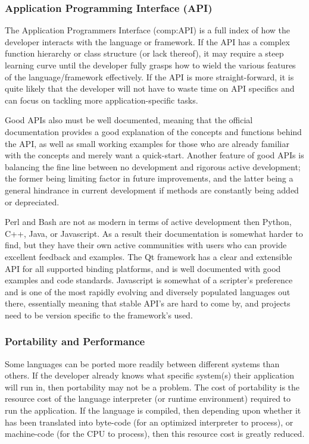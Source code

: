 \subsubsection{Application Programming Interface (API)}

The Application Programmers Interface (\gls{comp:API}) is a full index of how the developer interacts with the language or framework. If the API has a complex function hierarchy or class structure (or lack thereof), it may require a steep learning curve until the developer fully grasps how to wield the various features of the language/framework effectively. If the API is more straight-forward, it is quite likely that the developer will not have to waste time on API specifics and can focus on tackling more application-specific tasks. 

Good APIs also must be well documented, meaning that the official documentation provides a good explanation of the concepts and functions behind the API, as well as small working examples for those who are already familiar with the concepts and merely want a quick-start. Another feature of good APIs is balancing the fine line between no development and rigorous active development; the former being limiting factor in future improvements, and the latter being a general hindrance in current development if methods are constantly being added or depreciated.

Perl and Bash are not as modern in terms of active development then Python, C++, Java, or Javascript. As a result their documentation is somewhat harder to find, but they have their own active communities with users who can provide excellent feedback and examples. The Qt framework has a clear and extensible API for all supported binding platforms, and is well documented with good examples and code standards. Javascript is somewhat of a scripter's preference and is one of the most rapidly evolving and diversely populated languages out there, essentially meaning that stable API's are hard to come by, and projects need to be version specific to the framework's used.

\subsubsection{Portability and Performance}

Some languages can be ported more readily between different systems than others. If the developer already knows what specific system(s) their application will run in, then portability may not be a problem. The cost of portability is the resource cost of the language interpreter (or runtime environment) required to run the application. If the language is compiled, then depending upon whether it has been translated into byte-code (for an optimized interpreter to process), or machine-code (for the CPU to process), then this resource cost is greatly reduced.

